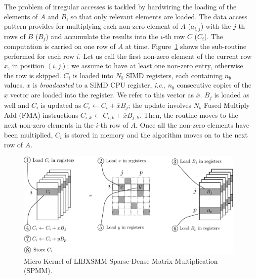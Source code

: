 The problem of irregular accesses is tackled by hardwiring the loading of the elements of $A$ and $B$, so that only relevant elements are loaded. The data access pattern provides for multiplying each non-zero element of $A$ ($a_{i,j}$) with the $j$-th rows of $B$ ($B_j$) and accumulate the results into the $i$-th row $C$ ($C_i$).
The computation is carried on one row of $A$ at time. Figure~\ref{fig:libxsmmsparsedensemicro} shows the sub-routine performed for each row $i$.  
Let us call the first non-zero element of the current row $x$, in position $(i,j)$; we assume to have at least one non-zero entry, otherwise the row is skipped. $C_i$ is loaded into $N_b$ SIMD registers, each containing $n_b$ values. $x$ is \emph{broadcasted} to a SIMD CPU register, \textit{i.e.}, $n_b$ consecutive copies of the $x$ vector are loaded into the register. We refer to this vector as $\overline{x}$. 
$B_j$ is loaded as well and $C_i$ is updated as $C_i \leftarrow C_i + \overline{x} B_j$; the update involves $N_b$ Fused Multiply Add (FMA) instructions $C_{i,k} \leftarrow C_{i,k} + \overline{x} B_{j,k}$. Then, the routine moves to the next non-zero elements in the $i$-th row of $A$. Once all the non-zero elements have been multiplied, $C_i$ is stored in memory and the algorithm moves on to the next row of $A$.  


\begin{figure}[t]
\centering
	\includegraphics[width=\columnwidth]{imgs/libxsmm_sparse_dense_mult_micro.pdf}
	\caption{Micro Kernel of LIBXSMM Sparse-Dense Matrix Multiplication (SPMM).}
	\label{fig:libxsmmsparsedensemicro}
\end{figure}

